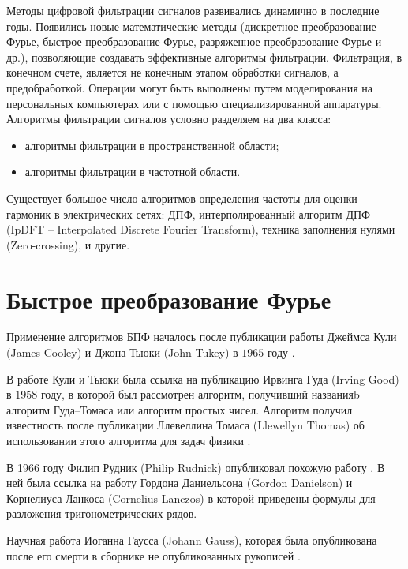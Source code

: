 Методы цифровой фильтрации сигналов развивались динамично в последние годы. Появились новые математические методы (дискретное преобразование Фурье, быстрое преобразование Фурье, разряженное преобразование Фурье и др.), позволяющие создавать эффективные алгоритмы фильтрации. Фильтрация, в конечном счете, является не конечным этапом обработки сигналов, а предобработкой. Операции могут быть выполнены путем моделирования на персональных компьютерах или с помощью специализированной аппаратуры.
Алгоритмы фильтрации сигналов условно разделяем на два класса:
\begin{itemize}
\item алгоритмы фильтрации в пространственной области;
\item алгоритмы фильтрации в частотной области.
\end{itemize}



Существует большое число алгоритмов определения частоты для оценки гармоник в электрических сетях: ДПФ, интерполированный алгоритм ДПФ (IpDFT -- Interpolated Discrete Fourier Transform), техника заполнения нулями (Zero-crossing), и другие.
\section{Быстрое преобразование Фурье} \label{sec:ch2/sec1}

Применение алгоритмов БПФ началось после публикации работы Джеймса Кули (James Cooley) и Джона Тьюки (John Tukey) в $1965$ году \cite{cooley1965algorithm}. 

В работе Кули и Тьюки была ссылка на публикацию Ирвинга Гуда (Irving Good) \cite{good1958interaction} в $1958$ году, в которой был рассмотрен алгоритм, получивший названияb алгоритм Гуда–Томаса или алгоритм простых чисел. Алгоритм получил известность после публикации Ллевеллина Томаса (Llewellyn Thomas) об использовании этого алгоритма для задач физики \cite{thomas1963using}.

В 1966 году Филип Рудник (Philip Rudnick) опубликовал похожую работу \cite{rudnick1966note}. В ней была ссылка на работу Гордона Даниельсона (Gordon Danielson) и Корнелиуса Ланкоса (Cornelius Lanczos) \cite{danielson1942some} в которой приведены формулы для разложения тригонометрических рядов. 

Научная работа Иоганна Гаусса (Johann Gauss), которая была опубликована после его смерти в сборнике не опубликованных рукописей \cite{gauss1866nachlass}.

